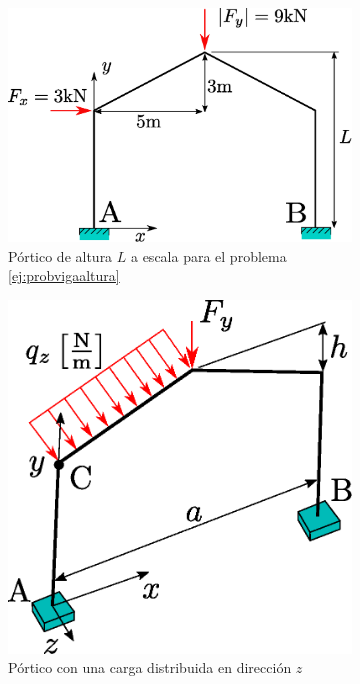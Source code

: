 \documentclass[11pt, a4paper,titlepage]{article}
\begin{document}
\begin{figure}[htb!]
	\centering
	\begin{subfigure}{0.49\linewidth}
		\centering
		\includegraphics[width=1\textwidth]{fig/ej1viga.eps}
		\caption{Pórtico de altura $L$ a escala para el problema \ref{ej:probvigaaltura} }
		\label{fig:ej1viga}
	\end{subfigure}
	\begin{subfigure}{0.49\linewidth}
		\centering
	\includegraphics[width=.663\textwidth]{fig/ej2viga.eps}
	\caption{Pórtico con una carga distribuida en dirección $z$}
	\label{fig:ej2viga}
	\end{subfigure}
\caption{}
\label{fig:ejPorticos}
\end{figure}
\end{document}
